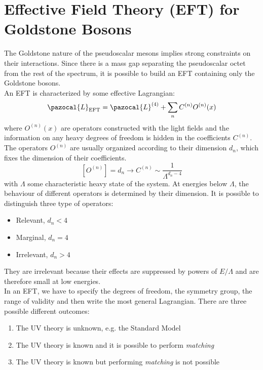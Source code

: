\documentclass[../main.tex]{subfiles}
\begin{document}
\section{Effective Field Theory (EFT) for Goldstone Bosons}
The Goldstone nature of the pseudoscalar mesons implies strong constraints on their interactions. Since there is a mass gap separating the pseudoscalar octet from the rest of the spectrum, it is possible to build an EFT containing only the Goldstone bosons.\\
An EFT is characterized by some effective Lagrangian:
\[
\pazocal{L}_{\text{EFT}}=\pazocal{L}^{(4)}+\sum_n C^{(n)}O^{(n)}(x)
\]
where $O^{(n)}(x)$ are operators constructed with the light fields and the information on any heavy degrees of freedom is hidden in the coefficients $C^{(n)}$. The
operators $O^{(n)}$ are usually organized according to their dimension $d_n$, which fixes the dimension of their coefficients.
\[
[O^{(n)}]=d_n\to C^{(n)}\sim\frac{1}{\Lambda^{d_n-4}}
\]
with $\Lambda$ some characteristic heavy state of the system. At energies below $\Lambda$, the behaviour of different operators is determined by their dimension. It is possible to distinguish three type of operators:
\begin{itemize}
    \item Relevant, $d_n<4$
    \item Marginal, $d_n=4$
    \item Irrelevant, $d_n>4$
\end{itemize}
They are irrelevant because their effects are suppressed by powers of $E/\Lambda$ and are therefore small at low energies.\\
In an EFT, we have to specify the degrees of freedom, the symmetry group, the range of validity and then write the most general Lagrangian. There are three possible different outcomes:
\begin{enumerate}
    \item The UV theory is unknown, e.g. the Standard Model
    \item The UV theory is known and it is possible to perform \textit{matching}
    \item The UV theory is known but performing \textit{matching} is not possible
\end{enumerate}
\end{document}
